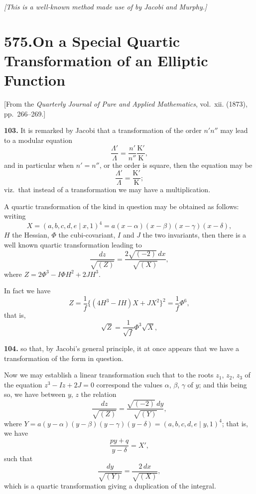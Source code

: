 \documentclass[11pt,a4paper]{book}
\begin{document}
\smallskip
\textit{[This is a well-known method made use of by Jacobi and Murphy.]}


\newpage
\section*{575.\quad On a Special Quartic Transformation of an Elliptic Function}

\begin{flushright}
\small[From the \textit{Quarterly Journal of Pure and Applied Mathematics}, vol.~xii. (1873), pp.~266--269.]
\end{flushright}

\noindent\textbf{103.} It is remarked by Jacobi that a transformation of the order $n'n''$ may lead to a modular equation
\[
\frac{\Lambda'}{\Lambda} = \frac{n'}{n''}\frac{\mathrm{K}'}{\mathrm{K}},
\]
and in particular when $n' = n''$, or the order is square, then the equation may be
\[
\frac{\Lambda'}{\Lambda} = \frac{\mathrm{K}'}{\mathrm{K}};
\]
viz.\ that instead of a transformation we may have a multiplication.

A quartic transformation of the kind in question may be obtained as follows: writing
\[
X = (a, b, c, d, e\!\!\mid x, 1)^4 = a(x-\alpha)(x-\beta)(x-\gamma)(x-\delta),
\]
$H$ the Hessian, $\Phi$ the cubi-covariant, $I$ and $J$ the two invariants, then there is a well known quartic transformation leading to
\[
\frac{dz}{\sqrt{(Z)}} = \frac{2\sqrt{(-2)}\,dx}{\sqrt{(X)}},
\]
where $Z = 2\Phi^3 - I\Phi H^2 + 2JH^3$.

In fact we have
\[
Z = \frac{1}{f}\{(4H^3 - IH)X + JX^2\}^2 = \frac{1}{f}\Phi^6,
\]
that is,
\[
\sqrt{Z} = \frac{1}{\sqrt{f}}\Phi^3\sqrt{X},
\]

\noindent\textbf{104.} so that, by Jacobi's general principle, it at once appears that we have a transformation of the form in question.

Now we may establish a linear transformation such that to the roots $z_1$, $z_2$, $z_3$ of the equation $z^3 - Iz + 2J = 0$ correspond the values $\alpha$, $\beta$, $\gamma$ of $y$; and this being so, we have between $y$, $z$ the relation
\[
\frac{dz}{\sqrt{(Z)}} = \frac{\sqrt{(-2)}\,dy}{\sqrt{(Y)}},
\]
where $Y = a(y-\alpha)(y-\beta)(y-\gamma)(y-\delta) = (a, b, c, d, e\!\!\mid y, 1)^4$; that is, we have
\[
\frac{py + q}{y - \delta} = X',
\]
such that
\[
\frac{dy}{\sqrt{(Y)}} = \frac{2\,dx}{\sqrt{(X)}},
\]
which is a quartic transformation giving a duplication of the integral.
\end{document}
